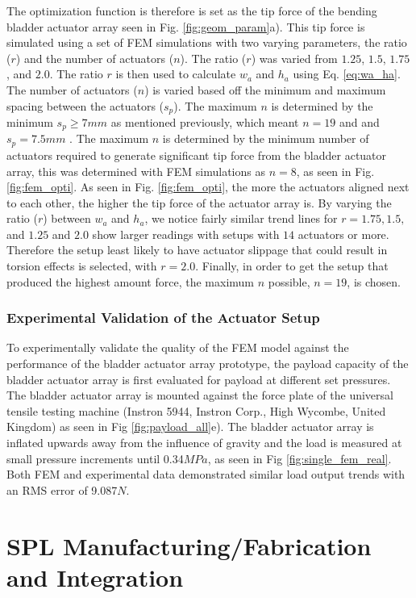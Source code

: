 \documentclass[letterpaper, 10 pt, conference]{ieeeconf}  %
\begin{document}
The optimization function is therefore is set as the tip force of the bending bladder actuator array seen in  Fig. \ref{fig:geom_param}a). This tip force is simulated using a set of FEM simulations with two varying parameters, the ratio ($r$) and the number of actuators ($n$). The ratio ($r$) was varied from $1.25$, $1.5$, $1.75$, and $2.0$. The ratio $r$ is then used to calculate $w_a$ and $h_a$ using Eq. \ref{eq:wa_ha}. The number of actuators ($n$) is varied based off the minimum and maximum spacing between the actuators ($s_p$). The maximum $n$ is determined by the minimum $s_p \geq 7mm$ as mentioned previously, which meant $n = 19$ and and $s_p = 7.5mm$ . The maximum $n$ is determined by the minimum number of actuators required to generate significant tip force from the bladder actuator array, this was determined with FEM simulations as $n = 8$, as seen in Fig. \ref{fig:fem_opti}. As seen in Fig. \ref{fig:fem_opti}, the more the actuators aligned next to each other, the higher the tip force of the actuator array is. By varying the ratio ($r$) between $w_a$ and $h_a$, we notice fairly similar trend lines for $r = 1.75, 1.5,$ and $1.25$ and $2.0$ show larger readings with setups with $14$ actuators or more. Therefore the setup least likely to have actuator slippage that could result in torsion effects is selected, with $r =2.0$. Finally, in order to get the setup that produced the highest amount force, the maximum $n$ possible, $n = 19$, is chosen. 

\subsubsection{Experimental Validation of the Actuator Setup}

To experimentally validate the quality of the FEM model against the performance of the bladder actuator array prototype, the payload capacity of the bladder actuator array is first evaluated for payload at different set pressures. The bladder actuator array is mounted against the force plate of the universal tensile testing machine (Instron 5944, Instron Corp., High Wycombe, United Kingdom) as seen in Fig \ref{fig:payload_all}e). The bladder actuator array is inflated upwards away from the influence of gravity and the load is measured at small pressure increments until 0.34$MPa$, as seen in Fig \ref{fig:single_fem_real}. Both FEM and experimental data demonstrated similar load output trends with an RMS error of 9.087$N$. 


\section{SPL Manufacturing/Fabrication and Integration}
\end{document}
